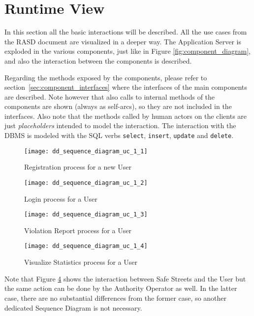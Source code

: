 \section{Runtime View}
In this section all the basic interactions will be described. All the use cases
from the RASD document are visualized in a deeper way. The Application Server is
exploded in the various components, just like in Figure
\ref{fig:component_diagram}, and also the interaction between the components is
described.

Regarding the methods exposed by the components, please refer to
section~\ref{sec:component_interfaces} where the interfaces of the main
components are described. Note however that also calls to internal methods of
the components are shown (always as self-arcs), so they are not included in the
interfaces.
Also note that the methods called by human actors on the clients are just
\emph{placeholders} intended to model the interaction.
The interaction with the DBMS is modeled with the SQL verbs \texttt{select},
\texttt{insert}, \texttt{update} and \texttt{delete}.

\begin{figure}[ht]
    \centering
    \texttt{[image: dd\_sequence\_diagram\_uc\_1\_1]}
    \caption{Registration process for a new User}
    \label{fig:dd_sequence_diagram_uc_1_1}
\end{figure}

\begin{figure}[ht]
    \centering
    \texttt{[image: dd\_sequence\_diagram\_uc\_1\_2]}
    \caption{Login process for a User}
    \label{fig:dd_sequence_diagram_uc_1_2}
\end{figure}

\begin{figure}[ht]
    \centering
    \texttt{[image: dd\_sequence\_diagram\_uc\_1\_3]}
    \caption{Violation Report process for a User}
    \label{fig:dd_sequence_diagram_uc_1_3}
\end{figure}

\clearpage

\begin{figure}[ht]
    \centering
    \texttt{[image: dd\_sequence\_diagram\_uc\_1\_4]}
    \caption{Visualize Statistics process for a User}
    \label{fig:dd_sequence_diagram_uc_1_4}
\end{figure}

Note that Figure \ref{fig:dd_sequence_diagram_uc_1_4} shows the interaction
between Safe Streets and the User but the same action can be done by the
Authority Operator as well. In the latter case, there are no substantial
differences from the former case, so another dedicated Sequence Diagram is not
necessary.

